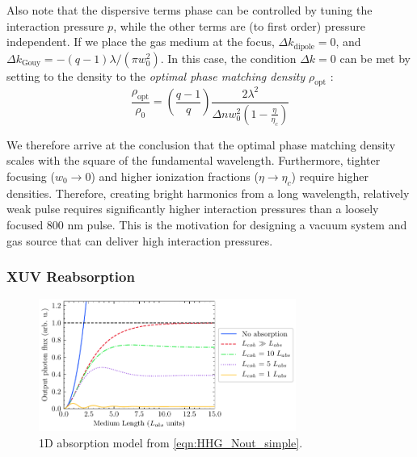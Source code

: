 Also note that the dispersive terms phase can be controlled by tuning the interaction pressure $p$, while the other terms are (to first order) pressure independent. If we place the gas medium at the focus, $\Delta k_{\textrm{dipole}} = 0$, and $\Delta k_{\textrm{Gouy}} = -(q-1) \lambda / (\pi w_0^2)$. In this case, the condition $\Delta k = 0$ can be met by setting to the density to the \textit{optimal phase matching density} $\rho_{\textrm{opt}}$ \cite{rothhardtAbsorptionlimitedPhasematchedHigh2014}:
\begin{equation}
\frac{\rho_{\textrm{opt}}}{\rho_0} = \left( \frac{q-1}{q} \right) \frac{2 \lambda^2}{\Delta n w_0^2 \left(1 - \frac{\eta}{\eta_c}\right)}
\label{eqn:phase_matching_density}
\end{equation}



We therefore arrive at the conclusion that the optimal phase matching density scales with the square of the fundamental wavelength. Furthermore, tighter focusing (${w_0 \rightarrow 0}$) and higher ionization fractions (${\eta \rightarrow \eta_c}$) require higher densities. Therefore, creating bright harmonics from a long wavelength, relatively weak pulse requires significantly higher interaction pressures than a loosely focused 800 nm pulse. This is the motivation for designing a vacuum system and gas source that can deliver high interaction pressures.

\subsubsection{XUV Reabsorption}
\label{sec:XUV_reabsorption}

\begin{figure}
	\centering
	\includegraphics[width=0.75\textwidth]{figures/chap1/Constant1999_fig1.pdf}
	\caption{1D absorption model from \cref{eqn:HHG_Nout_simple}.}
	\label{fig:Constant1999_fig1}
\end{figure}

